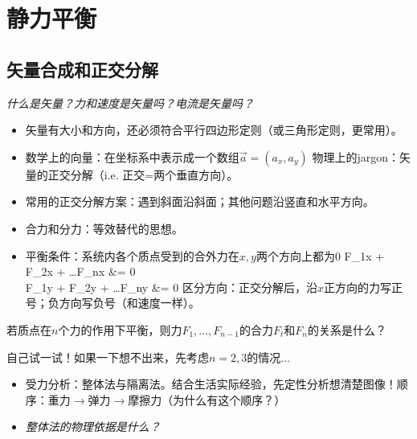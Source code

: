 \documentclass[a4paper,9pt]{ctexart}
\begin{document}
\newpage

\section{静力平衡}
\subsection{矢量合成和正交分解}
\emph{什么是矢量？力和速度是矢量吗？电流是矢量吗？}
\begin{itemize}
\item
矢量有大小和方向，还必须符合平行四边形定则（或三角形定则，更常用）。
\item
数学上的向量：在坐标系中表示成一个数组$\vec a = (a_x,a_y)$ \so 物理上的jargon：矢量的正交分解（i.e. 正交=两个垂直方向）。
\item
常用的正交分解方案：遇到斜面沿斜面；其他问题沿竖直和水平方向。
\item
合力和分力：等效替代的思想。
\item
平衡条件：系统内各个质点受到的合外力在$x,y$两个方向上都为0
\bea
F_{1x} + F_{2x} + \dots F_{nx} &= 0 \\
F_{1y} + F_{2y} + \dots F_{ny} &= 0
\eea
区分方向：正交分解后，沿$x$正方向的力写正号；负方向写负号（和速度一样）。
\end{itemize}
\begin{eg}
若质点在$n$个力的作用下平衡，则力$F_1,\dots, F_{n-1}$的合力$F_t$和$F_n$的关系是什么？
\end{eg}
\begin{ans}
自己试一试！如果一下想不出来，先考虑$n=2,3$的情况...
\vspace{2cm}
\end{ans}
\begin{itemize}
\item
受力分析：整体法与隔离法。结合生活实际经验，先定性分析想清楚图像！顺序：重力$\to$弹力$\to$摩擦力（为什么有这个顺序？）
\item
\emph{整体法的物理依据是什么？}
\end{itemize}
\end{document}
